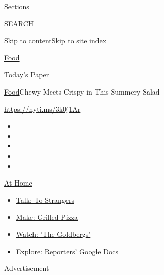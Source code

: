 Sections

SEARCH

\protect\hyperlink{site-content}{Skip to
content}\protect\hyperlink{site-index}{Skip to site index}

\href{https://www.nytimes3xbfgragh.onion/section/food}{Food}

\href{https://myaccount.nytimes3xbfgragh.onion/auth/login?response_type=cookie\&client_id=vi}{}

\href{https://www.nytimes3xbfgragh.onion/section/todayspaper}{Today's
Paper}

\href{/section/food}{Food}\textbar{}Chewy Meets Crispy in This Summery
Salad

\url{https://nyti.ms/3k0j1Ar}

\begin{itemize}
\item
\item
\item
\item
\item
\end{itemize}

\href{https://www.nytimes3xbfgragh.onion/spotlight/at-home?action=click\&pgtype=Article\&state=default\&region=TOP_BANNER\&context=at_home_menu}{At
Home}

\begin{itemize}
\tightlist
\item
  \href{https://www.nytimes3xbfgragh.onion/2020/08/03/well/family/the-benefits-of-talking-to-strangers.html?action=click\&pgtype=Article\&state=default\&region=TOP_BANNER\&context=at_home_menu}{Talk:
  To Strangers}
\item
  \href{https://www.nytimes3xbfgragh.onion/2020/08/01/at-home/coronavirus-make-pizza-on-a-grill.html?action=click\&pgtype=Article\&state=default\&region=TOP_BANNER\&context=at_home_menu}{Make:
  Grilled Pizza}
\item
  \href{https://www.nytimes3xbfgragh.onion/2020/07/31/arts/television/goldbergs-abc-stream.html?action=click\&pgtype=Article\&state=default\&region=TOP_BANNER\&context=at_home_menu}{Watch:
  'The Goldbergs'}
\item
  \href{https://www.nytimes3xbfgragh.onion/interactive/2020/at-home/even-more-reporters-editors-diaries-lists-recommendations.html?action=click\&pgtype=Article\&state=default\&region=TOP_BANNER\&context=at_home_menu}{Explore:
  Reporters' Google Docs}
\end{itemize}

Advertisement

